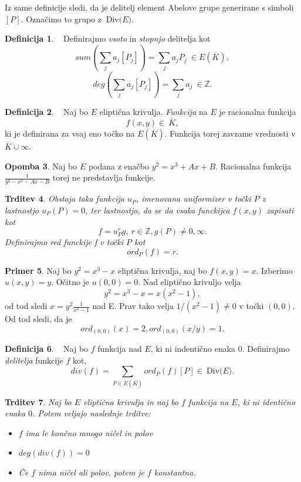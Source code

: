 \documentclass[12pt,a4paper,twoside]{article}
\theoremstyle{definition} %
\newtheorem{definicija}{Definicija}[section]
\newtheorem{primer}[definicija]{Primer}
\newtheorem{opomba}[definicija]{Opomba}
\theoremstyle{plain} %
\newtheorem{trditev}[definicija]{Trditev}
\numberwithin{equation}{section}  %
\newcommand{\Z}{\mathbb Z}
\newcommand{\E}[1]{E({#1})}
\newcommand{\DIV}[1]{\ \text{Div(}{#1}\text{)}}
\begin{document}
Iz same definicije sledi, da je delitelj element Abelove grupe generirane s simboli $[P]$. Označimo to grupo z $\DIV{E}$.


\begin{definicija}~
Definirajmo \emph{vsoto} in \emph{stopnjo} delitelja kot
$$sum(\sum_{j}a_j[P_j]) = \sum_ja_jP_j \ \in \E{\overline{K}},$$
$$deg(\sum_{j}a_j[P_j]) = \sum_ja_j \ \in \Z.$$

\end{definicija}


\begin{definicija}~
Naj bo $E$ eliptična krivulja. \emph{Funkcija} na $E$ je racionalna funkcija $$f(x,y) \in \ \overline{K},$$ ki je definirana za vsaj eno točko na $\E{\overline{K}}$. Funkcija torej zavzame vrednosti v $\overline{K} \cup {\infty}$.
\end{definicija}

\begin{opomba}
Naj bo $E$ podana z enačbo $y^2 = x^3+Ax+B$. Racionalna funkcija $\frac{1}{y^2-x^3-Ax-B}$ torej ne predstavlja funkcije.

\end{opomba}

\begin{trditev}
Obstaja taka funkcija $u_P$, imenovana \emph{uniformizer} v točki $P$ z lastnostjo $u_P(P) = 0$, ter lastnostjo, da se da vsaka funckijca $f(x,y)$ zapisati kot
$$f = u^r_Pg, \ r\in \Z, g(P) \neq 0,\infty.$$
Definirajmo \emph{red} funckije f v točki $P$ kot
$$ord_P(f)=r.$$
\end{trditev}

\begin{primer}
Naj bo $y^2 = x^3-x$ eliptična krivulja, naj bo $f(x,y) = x$. Izberimo $u(x,y) = y$. Očitno je $u(0,0) = 0$. Nad eliptično krivuljo velja 
$$y^2 = x^3-x = x(x^2-1),$$ 
od tod sledi $x = y^2\frac{1}{x^2-1}$ nad E.
Prav tako velja $1/(x^2-1) \neq 0$ v točki $(0,0)$. Od tod sledi, da je 
$$ord_{(0,0)}(x) = 2, ord_{(0,0)}(x/y) = 1.$$
\end{primer}

\begin{definicija}~
Naj bo $f$ funkcija nad $E$, ki ni indentično enaka $0$. Definirajmo \emph{delitelja} funkcije $f$ kot,
$$div(f) = \sum_{P\in \E{\overline{K}}} ord_P(f)[P] \in \DIV{E}.$$
\end{definicija}


\begin{trditev}
\label{trditev 11.1}
Naj bo $E$ eliptična krivulja in naj bo $f$ funkcija na $E$, ki ni identično enaka $0$. Potem veljajo naslednje trditve:
\begin{itemize}

\item $f$ ima le končno mnogo ničel in polov
\item $deg(div(f))=0$
\item Če $f$ nima ničel ali polov, potem je $f$ konstantna.
\end{itemize}


\end{trditev}
\end{document}
